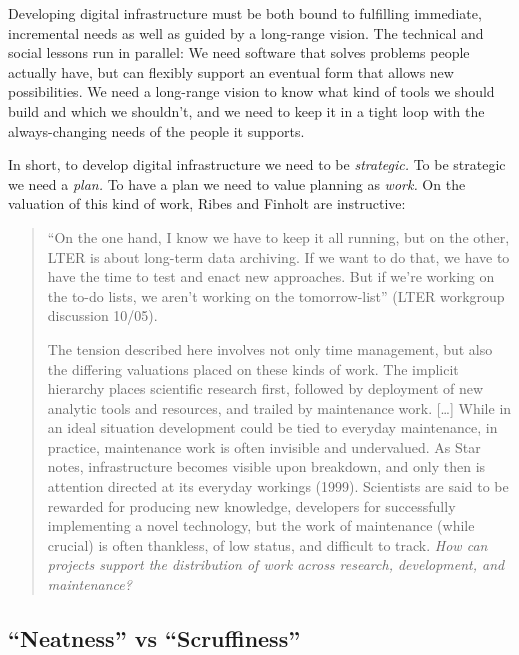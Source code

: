 Developing digital infrastructure must be both bound to fulfilling
immediate, incremental needs as well as guided by a long-range vision.
The technical and social lessons run in parallel: We need software that
solves problems people actually have, but can flexibly support an
eventual form that allows new possibilities. We need a long-range vision
to know what kind of tools we should build and which we shouldn't, and
we need to keep it in a tight loop with the always-changing needs of the
people it supports.

In short, to develop digital infrastructure we need to be
\emph{strategic.} To be strategic we need a \emph{plan.} To have a plan
we need to value planning as \emph{work.} On the valuation of this kind
of work, Ribes and Finholt are instructive:

\begin{quote}
``On the one hand, I know we have to keep it all running, but on the
other, LTER is about long-term data archiving. If we want to do that, we
have to have the time to test and enact new approaches. But if we're
working on the to-do lists, we aren't working on the tomorrow-list''
(LTER workgroup discussion 10/05).

The tension described here involves not only time management, but also
the differing valuations placed on these kinds of work. The implicit
hierarchy places scientific research first, followed by deployment of
new analytic tools and resources, and trailed by maintenance work.
{[}\ldots{]} While in an ideal situation development could be tied to
everyday maintenance, in practice, maintenance work is often invisible
and undervalued. As Star notes, infrastructure becomes visible upon
breakdown, and only then is attention directed at its everyday workings
(1999). Scientists are said to be rewarded for producing new knowledge,
developers for successfully implementing a novel technology, but the
work of maintenance (while crucial) is often thankless, of low status,
and difficult to track. \emph{How can projects support the distribution
of work across research, development, and maintenance?} \citep{ribesLongNowTechnology2009} 
\end{quote}

\hypertarget{neatness-vs-scruffiness}{%
\subsection{``Neatness'' vs
``Scruffiness''}\label{neatness-vs-scruffiness}}

